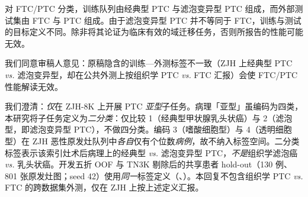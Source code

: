 \begin{reviewercomment}
对 FTC/PTC 分类，训练队列由经典型 PTC 与滤泡变异型 PTC 组成，而外部测试集由 FTC 与 PTC 组成。由于滤泡变异型 PTC 并不等同于 FTC，训练与测试的目标定义不同。除非将其论证为临床有效的域迁移任务，否则所报告的性能可能无效。
\end{reviewercomment}
\begin{authorresponse}
我们同意审稿人意见：原稿隐含的训练—外测标签不一致（ZJH 上经典型 PTC \emph{vs.} 滤泡变异型，却在公共外测上按组织学 PTC \emph{vs.} FTC 汇报）会使 FTC/PTC 性能解读无效。\par
我们澄清：\emph{仅}在 ZJH-8K 上开展 PTC \emph{亚型}子任务。病理「亚型」虽编码为四类，本研究将子任务定义为\emph{二分类}：仅比较 1（经典型甲状腺乳头状癌）与 2（滤泡型，即滤泡变异型 PTC），不做四分类。编码 3（嗜酸细胞型）与 4（透明细胞型）在 ZJH 恶性原发灶队列中\emph{各自}仅有个位数\emph{病例}，故不纳入标签空间。二分类标签表示该索引灶术后病理上的经典型 \emph{vs.} 滤泡变异型 PTC，\emph{不是}组织学滤泡癌 \emph{vs.} 乳头状癌。开发五折 OOF 与 TN3K 剔除后的共享患者 hold-out（130 例、801 张原发灶图；seed 42）使用\emph{同一}标签定义（、）。本回复不包含组织学 PTC \emph{vs.} FTC 的跨数据集外测，仅在 ZJH 上按上述定义汇报。\par
\par
\end{authorresponse}

